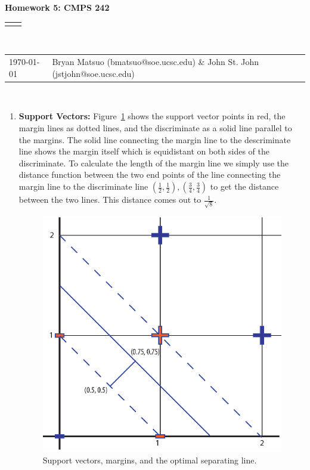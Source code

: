 \documentclass[12pt]{article}
\renewcommand{\title}[1]{\textbf{#1}\\}
\renewcommand{\line}{\begin{tabularx}{\textwidth}{X>{\raggedleft}X}\hline\\\end{tabularx}\\[-0.5cm]}
\newcommand{\leftright}[2]{\begin{tabularx}{\textwidth}{X>{\raggedleft}X}#1%
& #2\\\end{tabularx}\\[-0.5cm]}
\begin{document}
\title{Homework 5: CMPS 242}
\line
\leftright{\today}{Bryan Matsuo (bmatsuo@soe.ucsc.edu) \& John St. John (jstjohn@soe.ucsc.edu)} %
\begin{enumerate}
\item \textbf{Support Vectors:}
Figure~\ref{fig:vector} shows the support vector points in red, the margin lines as dotted lines, and the discriminate as a solid line parallel to the margins. The solid line connecting the margin line to the descriminate line shows the margin itself which is equidistant on both sides of the discriminate. To calculate the length of the margin line we simply use the distance function between the two end points of the line connecting the margin line to the discriminate line $\left(\frac{1}{2},\frac{1}{2}\right),\left(\frac{3}{4},\frac{3}{4}\right)$ to get the distance between the two lines. This distance comes out to $\frac{1}{\sqrt{8}}$.

\begin{figure}[htbp]
\begin{center}
\includegraphics[scale=1]{supportvectors.eps}
\caption{Support vectors, margins, and the optimal separating line.}
\label{fig:vector}
\end{center}
\end{figure}




\end{enumerate}
\end{document}
